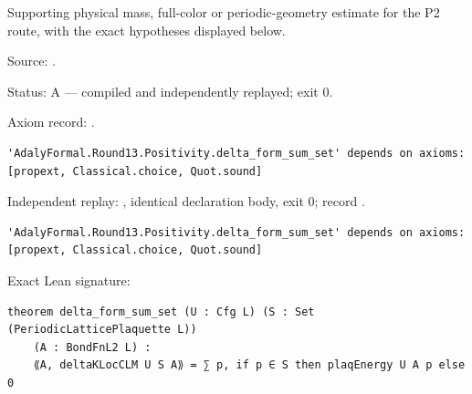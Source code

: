 \begin{theorem}[bp-450]
\label{bp-450}
\uses{}
\leanok
Supporting physical mass, full-color or periodic-geometry estimate for the P2 route, with the exact hypotheses displayed below.

\par Source: \texttt{}.
\par Status: A — compiled and independently replayed; exit 0.
\par Axiom record: \texttt{}.
\begin{verbatim}
'AdalyFormal.Round13.Positivity.delta_form_sum_set' depends on axioms: [propext, Classical.choice, Quot.sound]
\end{verbatim}
\par Independent replay: \texttt{}, identical declaration body, exit 0; record \texttt{}.
\begin{verbatim}
'AdalyFormal.Round13.Positivity.delta_form_sum_set' depends on axioms: [propext, Classical.choice, Quot.sound]
\end{verbatim}
\par Exact Lean signature:
\begin{verbatim}
theorem delta_form_sum_set (U : Cfg L) (S : Set (PeriodicLatticePlaquette L))
    (A : BondFnL2 L) :
    ⟪A, deltaKLocCLM U S A⟫ = ∑ p, if p ∈ S then plaqEnergy U A p else 0
\end{verbatim}
\end{theorem}

